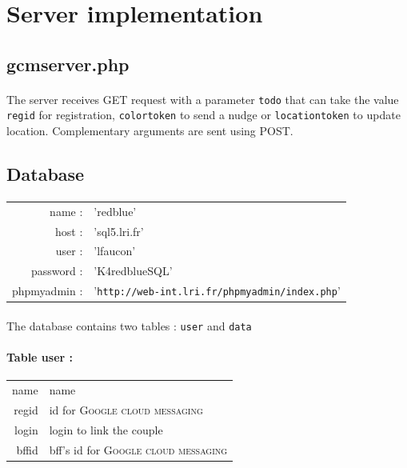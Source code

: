 \documentclass[12pt]{article}
\begin{document}
\newpage
\section{Server implementation}
\subsection{gcmserver.php}
\paragraph{}The server receives GET request with a parameter \verb?todo? that can take the value \verb?regid? for registration, \verb?colortoken? to send a nudge or \verb?locationtoken? to update location. Complementary arguments are sent using POST.



\subsection{Database}

\paragraph{}
\begin{tabular}{rl}
name :& 'redblue' \\
host :& 'sql5.lri.fr' \\
user :& 'lfaucon' \\
password :& 'K4redblueSQL' \\
phpmyadmin :& '\verb?http://web-int.lri.fr/phpmyadmin/index.php?' \\
\end{tabular}

\paragraph{}The database contains two tables : \verb?user? and \verb?data?
\paragraph{Table user :}
\begin{tabular}{r|l}
name & name \\
regid & id for \textsc{Google cloud messaging} \\
login & login to link the couple \\
bffid & bff's id for \textsc{Google cloud messaging} \\
\end{tabular}
\end{document}
